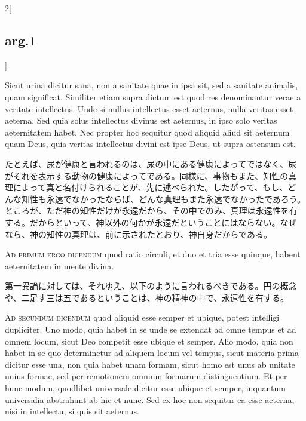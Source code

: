 \documentclass[paper=a4paper,fontsize=10pt,jafontsize=9pt,titlepage]{jlreq}
\begin{document}
\begin{paracol}{2}[\subsection{arg.1}]
\switchcolumn*


Sicut urina dicitur sana, non a sanitate quae in ipsa sit, sed a
sanitate animalis, quam significat. Similiter etiam supra dictum est
quod res denominantur verae a veritate intellectus. Unde si nullus
intellectus esset aeternus, nulla veritas esset aeterna. Sed quia
solus intellectus divinus est aeternus, in ipso solo veritas
aeternitatem habet. Nec propter hoc sequitur quod aliquid aliud sit
aeternum quam Deus, quia veritas intellectus divini est ipse Deus, ut
supra ostensum est.

\switchcolumn

たとえば、尿が健康と言われるのは、尿の中にある健康によってではなく、尿
がそれを表示する動物の健康によってである。同様に、事物もまた、知性の真
理によって真と名付けられることが、先に述べられた。したがって、もし、ど
んな知性も永遠でなかったならば、どんな真理もまた永遠でなかったであろう。
ところが、ただ神の知性だけが永遠だから、その中でのみ、真理は永遠性を有
する。だからといって、神以外の何かが永遠だということにはならない。なぜ
なら、神の知性の真理は、前に示されたとおり、神自身だからである。

\switchcolumn*[\subsection{ad.1}]


{\scshape Ad primum ergo dicendum} quod ratio circuli, et duo et tria
esse quinque, habent aeternitatem in mente divina.

\switchcolumn

第一異論に対しては、それゆえ、以下のように言われるべきである。円の概念
や、二足す三は五であるということは、神の精神の中で、永遠性を有する。

\switchcolumn*[\subsection{ad.2}]


{\scshape Ad secundum dicendum} quod aliquid esse semper et ubique,
potest intelligi dupliciter. Uno modo, quia habet in se unde se
extendat ad omne tempus et ad omnem locum, sicut Deo competit esse
ubique et semper. Alio modo, quia non habet in se quo determinetur ad
aliquem locum vel tempus, sicut materia prima dicitur esse una, non
quia habet unam formam, sicut homo est unus ab unitate unius formae,
sed per remotionem omnium formarum distinguentium. Et per hunc modum,
quodlibet universale dicitur esse ubique et semper, inquantum
universalia abstrahunt ab hic et nunc. Sed ex hoc non sequitur ea esse
aeterna, nisi in intellectu, si quis sit aeternus.


\end{paracol}
\end{document}
